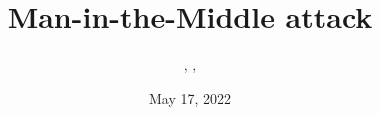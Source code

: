 \documentclass{../../../extra/styles/SecureRole}
\title{Man-in-the-Middle attack}
\author{\Ba, \Wi, \Zm}
\date{May 17, 2022}
\begin{document}
\makecover
\newpage

\tableofcontents

\newpage


\end{document}
